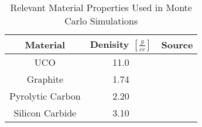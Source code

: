 \begin{table}[h!]
\centering
\caption{Relevant Material Properties Used in Monte Carlo Simulations}
\begin{tabular}{ c  c  c }
\hline
Material & Denisity $[\frac{g}{cc}]$ & Source \\
\hline
UCO & 11.0 & \cite{helmreich_year_2017, nagley_fabrication_2010}  \\
Graphite & 1.74 & \cite{ho_graphite_1988, johnson_properties_1976} \\
Pyrolytic Carbon & 2.20 & \cite{espi_metals_graphite-pyrolytic_2019} \\
Silicon Carbide & 3.10 & \cite{accuratus_silicon_2013} \\
\hline
\end{tabular}

\label{table:mat-params}
\end{table}